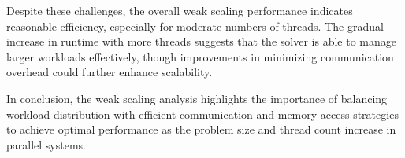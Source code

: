\documentclass[unicode,11pt,a4paper,oneside,numbers=endperiod,openany]{scrartcl}
\begin{document}
Despite these challenges, the overall weak scaling performance indicates reasonable efficiency, especially for moderate numbers of threads. The gradual increase in runtime with more threads suggests that the solver is able to manage larger workloads effectively, though improvements in minimizing communication overhead could further enhance scalability.

In conclusion, the weak scaling analysis highlights the importance of balancing workload distribution with efficient communication and memory access strategies to achieve optimal performance as the problem size and thread count increase in parallel systems.
\end{document}
